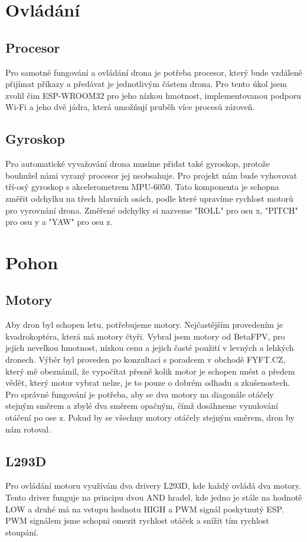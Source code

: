 \section{Ovládání}

\subsection*{Procesor}
    Pro samotné fungování a ovládání drona je potřeba procesor, který bude vzdáleně přijímat příkazy a předávat je jednotlivým částem drona. Pro tento úkol jsem zvolil čim ESP-WROOM32 pro jeho nízkou hmotnost, implementovanou podporu Wi-Fi a jeho dvě jádra, která umožňují pruběh více procesů zároveň.
    
\subsection*{Gyroskop}
    Pro automatické vyvažování drona musíme přidat také gyroskop, protože bouhužel námi vyraný procesor jej neobsahuje. Pro projekt nám bude vyhovovat tří-osý gyroskop s akcelerometrem MPU-6050. Tato komponenta je schopna změřit odchylku na třech hlavních osách, podle které upravíme rychlost motorů pro vyrovnání drona. Změřené odchylky si nazveme "ROLL" pro osu x, "PITCH" pro osu y a "YAW" pro osu z.
    
\section{Pohon}

\subsection*{Motory}
    Aby dron byl schopen letu, potřebujeme motory. Nejčastějším provedením je kvadrokoptéra, která má motory čtyři. Vybral jsem motory od BetaFPV, pro jejich nevelkou hmotnost, nízkou cenu a jejich časté použití v levných a lehkých dronech.\cite{motorv1} Výběr byl proveden po konzultaci s poradcem v obchodě FYFT.CZ, který mě obeznámil, že vypočítat přesně kolik motor je schopen unést a předem vědět, který motor vybrat nelze, je to pouze o dobrém odhadu a zkušenostech. Pro správné fungování je potřeba, aby se dva motory na diagonále otáčely stejným směrem a zbylé dva směrem opačným, čímž dosáhneme vynulování otáčení po ose z. Pokud by se všechny motory otáčely stejným směrem, dron by nám rotoval.
    
\newpage

\subsection*{L293D}
    Pro ovládání motoru využívám dva drivery L293D, kde každý ovládá dva motory. Tento driver funguje na principu dvou AND hradel, kde jedno je stále na hodnotě LOW a druhé má na vstupu hodnotu HIGH a PWM signál poskytnutý ESP. PWM signálem jsme schopni omezit rychlost otáček a snížit tím rychlost stoupání.
    
